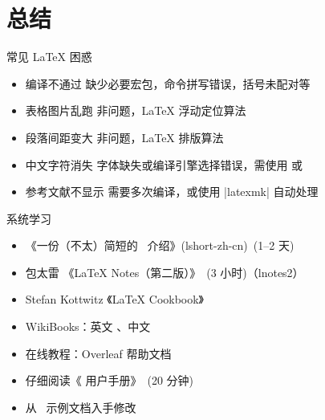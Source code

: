 
\section{总结}

\printcurrenttoc

\begin{frame}[fragile]{常见 \LaTeX{} 困惑}
  \begin{itemize}
    \item \alert{编译不通过} 缺少必要宏包，命令拼写错误，括号未配对等
    \item \alert{表格图片乱跑} 非问题，\LaTeX{} 浮动定位算法 
    \item \alert{段落间距变大} 非问题，\LaTeX{} 排版算法
    \item \alert{中文字符消失} 字体缺失或编译引擎选择错误，需使用 \XeLaTeX{} 或 \LuaLaTeX{}
    \item \alert{参考文献不显示} 需要多次编译，或使用 |latexmk| 自动处理
  \end{itemize}
\end{frame}

\begin{frame}{系统学习}
  \begin{itemize}
      \item 《一份（不太）简短的~\LaTeXe{} 介绍》(lshort-zh-cn)~(1--2 天) 
      \item 包太雷 《\LaTeX{} Notes（第二版）》~(3 小时)（lnotes2） 
      \item Stefan Kottwitz 《LaTeX Cookbook》
      \item WikiBooks：英文 、中文 
      \item 在线教程：Overleaf 帮助文档 
      \item 仔细阅读《\ThuThesis{} 用户手册》~(20 分钟)
      \item 从~\ThuThesis{} 示例文档入手修改
  \end{itemize}
\end{frame}

